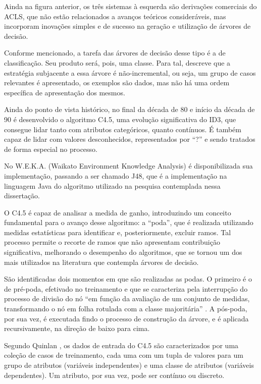 Ainda na figura anterior, os três sistemas à esquerda são derivações comerciais do ACLS, que não estão relacionados a avanços teóricos consideráveis, mas incorporam inovações simples e de sucesso na geração e utilização de árvores de decisão.

Conforme mencionado, a tarefa das árvores de decisão desse tipo é a de classificação.  Seu produto será, pois, uma classe. Para tal, \cite{Quinlan86inductionof} descreve que a estratégia subjacente a essa árvore é não-incremental, ou seja, um grupo de casos relevantes é apresentado, os exemplos são dados, mas não há uma ordem específica de apresentação dos mesmos. 

Ainda do ponto de vista histórico, no final da década de 80 e início da década de 90 \cite{Kohavi99decisiontree} é desenvolvido o algoritmo C4.5, uma evolução significativa do ID3, que consegue lidar tanto com atributos categóricos, quanto contínuos. É também capaz de lidar com valores desconhecidos, representados por “?” e sendo tratados de forma especial no processo.

No W.E.K.A. (Waikato Environment Knowledge Analysis) é disponibilizada sua implementação, passando a ser chamado J48, que é a implementação na linguagem Java do algoritmo utilizado na pesquisa contemplada nessa dissertação.

O C4.5 é capaz de analisar a medida de ganho, introduzindo um conceito fundamental para o avanço desse algoritmo: a “poda”, que é realizada utilizando medidas estatísticas para identificar e, posteriormente, excluir ramos. Tal processo permite o recorte de ramos que não apresentam contribuição significativa, melhorando o desempenho do algoritmos, que se tornou um dos  mais utilizados na literatura que contempla árvores de decisão. 

São identificadas dois momentos em que são realizadas as podas. O primeiro é o de pré-poda, efetivado no treinamento e que se caracteriza pela interrupção do processo de divisão do nó “em função da avaliação de um conjunto de medidas, transformando o nó em folha rotulada com a classe majoritária” \cite{Simoes2008}. A pós-poda, por sua vez, é executada findo o processo de construção da árvore, e é aplicada recursivamente, na direção de baixo para cima.

Segundo Quinlan \cite{Kohavi99decisiontree}, os dados de entrada do C4.5 são caracterizados por uma coleção de casos de treinamento, cada uma com um tupla de valores para um grupo de atributos (variáveis independentes) e uma classe de atributos (variáveis dependentes). Um atributo, por sua vez, pode ser contínuo ou discreto.

